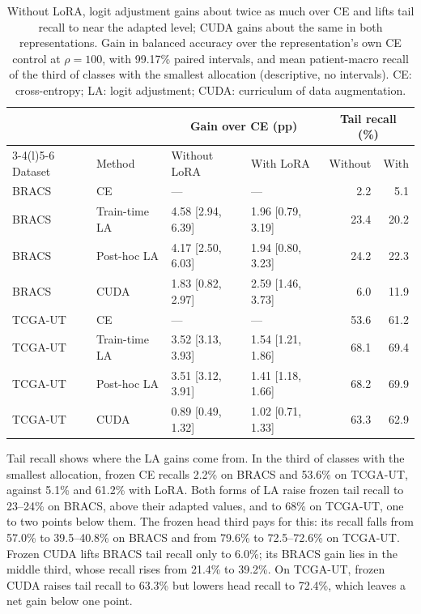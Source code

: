 \begin{table}[htbp]
\centering
\small
\renewcommand{\arraystretch}{1.15}
\setlength{\tabcolsep}{4pt}
\begin{tabular}{@{}llllrr@{}}
\toprule
& & \multicolumn{2}{c}{Gain over CE (pp)} & \multicolumn{2}{c}{Tail recall (\%)} \\
\cmidrule(lr){3-4}\cmidrule(l){5-6}
Dataset & Method & Without LoRA & With LoRA & Without & With \\
\midrule
BRACS & CE & --- & --- & 2.2 & 5.1 \\
BRACS & Train-time LA & 4.58 [2.94, 6.39] & 1.96 [0.79, 3.19] & 23.4 & 20.2 \\
BRACS & Post-hoc LA & 4.17 [2.50, 6.03] & 1.94 [0.80, 3.23] & 24.2 & 22.3 \\
BRACS & CUDA & 1.83 [0.82, 2.97] & 2.59 [1.46, 3.73] & 6.0 & 11.9 \\
TCGA-UT & CE & --- & --- & 53.6 & 61.2 \\
TCGA-UT & Train-time LA & 3.52 [3.13, 3.93] & 1.54 [1.21, 1.86] & 68.1 & 69.4 \\
TCGA-UT & Post-hoc LA & 3.51 [3.12, 3.91] & 1.41 [1.18, 1.66] & 68.2 & 69.9 \\
TCGA-UT & CUDA & 0.89 [0.49, 1.32] & 1.02 [0.71, 1.33] & 63.3 & 62.9 \\
\bottomrule
\end{tabular}
\caption{Without LoRA, logit adjustment gains about twice as much over CE and lifts tail recall to near the adapted level; CUDA gains about the same in both representations. Gain in balanced accuracy over the representation's own CE control at $\rho=100$, with 99.17\% paired intervals, and mean patient-macro recall of the third of classes with the smallest allocation (descriptive, no intervals). CE: cross-entropy; LA: logit adjustment; CUDA: curriculum of data augmentation.}
\label{tab:secondary}
\end{table}

Tail recall shows where the LA gains come from. In the third of classes with the smallest allocation, frozen CE recalls 2.2\% on BRACS and 53.6\% on TCGA-UT, against 5.1\% and 61.2\% with LoRA. Both forms of LA raise frozen tail recall to 23--24\% on BRACS, above their adapted values, and to 68\% on TCGA-UT, one to two points below them. The frozen head third pays for this: its recall falls from 57.0\% to 39.5--40.8\% on BRACS and from 79.6\% to 72.5--72.6\% on TCGA-UT. Frozen CUDA lifts BRACS tail recall only to 6.0\%; its BRACS gain lies in the middle third, whose recall rises from 21.4\% to 39.2\%. On TCGA-UT, frozen CUDA raises tail recall to 63.3\% but lowers head recall to 72.4\%, which leaves a net gain below one point.

